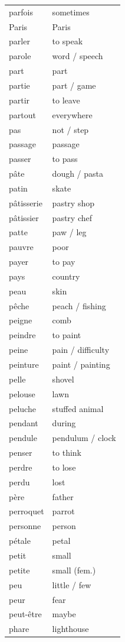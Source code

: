 \documentclass[12pt,a4paper]{article}
\begin{document}
\begin{longtable}{p{4cm} p{6cm}}
parfois & sometimes \\
Paris & Paris \\
parler & to speak \\
parole & word / speech \\
part & part \\
partie & part / game \\
partir & to leave \\
partout & everywhere \\
pas & not / step \\
passage & passage \\
passer & to pass \\
pâte & dough / pasta \\
patin & skate \\
pâtisserie & pastry shop \\
pâtissier & pastry chef \\
patte & paw / leg \\
pauvre & poor \\
payer & to pay \\
pays & country \\
peau & skin \\
pêche & peach / fishing \\
peigne & comb \\
peindre & to paint \\
peine & pain / difficulty \\
peinture & paint / painting \\
pelle & shovel \\
pelouse & lawn \\
peluche & stuffed animal \\
pendant & during \\
pendule & pendulum / clock \\
penser & to think \\
perdre & to lose \\
perdu & lost \\
père & father \\
perroquet & parrot \\
personne & person \\
pétale & petal \\
petit & small \\
petite & small (fem.) \\
peu & little / few \\
peur & fear \\
peut-être & maybe \\
phare & lighthouse \\

\end{longtable}
\end{document}
